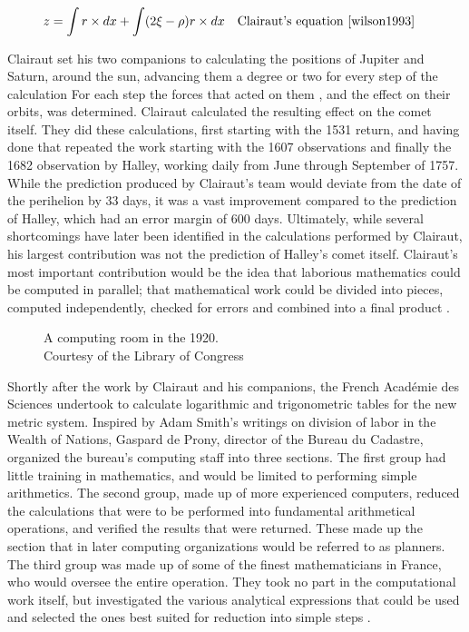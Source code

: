 \documentclass[\rootfolder/main.tex]{subfiles}
\begin{document}
\begin{align*} \label{eqn:clairaut}
  z &= \int r \times dx + \int (2 \xi - \rho)r \times dx && \text{Clairaut's equation \cite{wilson1993}}
\end{align*}

Clairaut set his two companions to calculating the positions of Jupiter and Saturn, around the sun, advancing them a degree or two for every step of the calculation
For each step the forces that acted on them , and the effect on their orbits, was determined.
Clairaut calculated the resulting effect on the comet itself.
They did these calculations, first starting with the 1531 return, and having done that repeated the work starting with the 1607 observations and finally the 1682 observation by Halley,
working daily from June through September of 1757.
While the prediction produced by Clairaut's team would deviate from the date of the perihelion by 33 days, it was a vast improvement compared to the prediction of Halley, which had an error margin of 600 days.
Ultimately, while several shortcomings have later been identified in the calculations performed by Clairaut, his largest contribution was not the prediction of Halley's comet itself.
Clairaut's most important contribution would be the idea that laborious mathematics could be computed in parallel;
that mathematical work could be divided into pieces, computed independently, checked for errors and combined into a final product \cite{grier1955}.

\begin{figure}[h]
    \caption[A computing room in the 1920s]
            {A computing room in the 1920. \\ Courtesy of the Library of Congress \label{fig:tabulatingroom}}
\end{figure}

Shortly after the work by Clairaut and his companions, the French Académie des Sciences undertook to calculate logarithmic and trigonometric tables for the new metric system.
Inspired by Adam Smith's writings on division of labor in the Wealth of Nations, Gaspard de Prony, director of the Bureau du Cadastre, organized the bureau's computing staff into three sections.
The first group had little training in mathematics, and would be limited to performing simple arithmetics.
The second group, made up of more experienced computers, reduced the calculations that were to be performed into fundamental arithmetical operations, and verified the results that were returned.
These made up the section that in later computing organizations would be referred to as planners.
The third group was made up of some of the finest mathematicians in France, who would oversee the entire operation.
They took no part in the computational work itself, but investigated the various analytical expressions that could be used and selected the ones best suited for reduction into simple steps \cite{hyman1985}.
\end{document}
